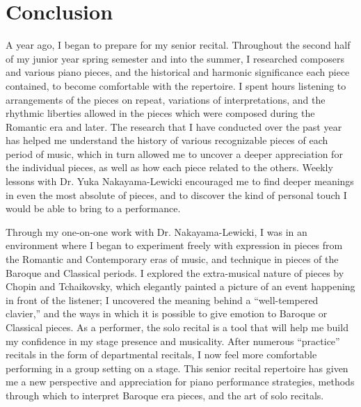 \chapter*{Conclusion}\label{conclusion}

A year ago, I began to prepare for my senior recital. Throughout the second half of my junior year spring semester and into the summer, I researched composers and various piano pieces, and the historical and harmonic significance each piece contained, to become comfortable with the repertoire. I spent hours listening to arrangements of the pieces on repeat, variations of interpretations, and the rhythmic liberties allowed in the pieces which were composed during the Romantic era and later. The research that I have conducted over the past year has helped me understand the history of various recognizable pieces of each period of music, which in turn allowed me to uncover a deeper appreciation for the individual pieces, as well as how each piece related to the others. Weekly lessons with Dr. Yuka Nakayama-Lewicki encouraged me to find deeper meanings in even the most absolute of pieces, and to discover the kind of personal touch I would be able to bring to a performance. 

Through my one-on-one work with Dr. Nakayama-Lewicki, I was in an environment where I began to experiment freely with expression in pieces from the Romantic and Contemporary eras of music, and technique in pieces of the Baroque and Classical periods. I explored the extra-musical nature of pieces by Chopin and Tchaikovsky, which elegantly painted a picture of an event happening in front of the listener; I uncovered the meaning behind a ``well-tempered clavier,'' and the ways in which it is possible to give emotion to Baroque or Classical pieces. As a performer, the solo recital is a tool that will help me build my confidence in my stage presence and musicality. After numerous ``practice'' recitals in the form of departmental recitals, I now feel more comfortable performing in a group setting on a stage. This senior recital repertoire has given me a new perspective and appreciation for piano performance strategies, methods through which to interpret Baroque era pieces, and the art of solo recitals.